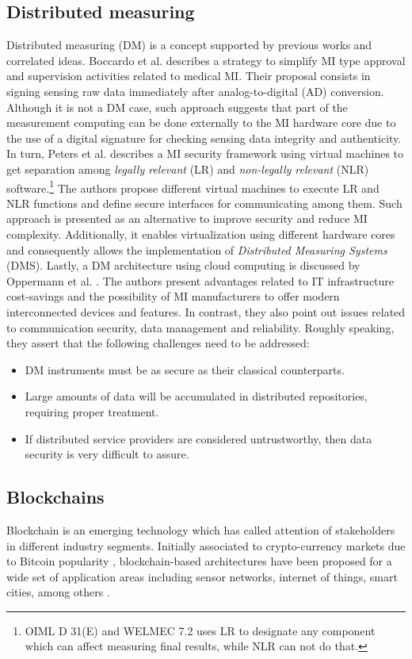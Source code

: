 \documentclass[journal]{IEEEtran}
\begin{document}
\subsection{Distributed measuring}
Distributed measuring (DM) is a concept supported by previous works and correlated ideas. 
Boccardo et al. \cite{Boccardo2014} describes a strategy to simplify MI type approval and supervision activities related to medical MI.
Their proposal consists in signing sensing raw data immediately after analog-to-digital (AD) conversion. 
Although it is not a DM case, such approach suggests that part of the measurement computing can be done externally to the MI hardware core due to the use of a digital signature for checking sensing data integrity and authenticity.
In turn, Peters et al. \cite{Peters2015} describes a MI security framework using virtual machines to get separation among \emph{legally relevant} (LR) and \emph{non-legally relevant} (NLR) software.\footnote{OIML D 31(E) and WELMEC 7.2 uses LR to designate any component which can affect measuring final results, while NLR can not do that.} The authors propose different virtual machines to execute LR and NLR functions and define secure interfaces for communicating among them. Such approach is presented as an alternative to improve security and reduce MI complexity. Additionally, it enables virtualization using different hardware cores and consequently allows the implementation of \emph{Distributed Measuring Systems} (DMS). Lastly, a DM architecture using cloud computing is discussed by Oppermann et al. \cite{Oppermann2016}. The authors present advantages related to IT infrastructure cost-savings and the possibility of MI manufacturers to offer modern interconnected devices and features. In contrast, they also point out issues related to communication security, data management and reliability. Roughly speaking, they assert that the following challenges need to be addressed:
\begin{itemize}
 \item DM instruments must be as secure as their classical counterparts.
 \item Large amounts of data will be accumulated in distributed repositories, requiring proper treatment.
 \item If distributed service providers are considered untrustworthy, then data security is very difficult to assure. 
\end{itemize}

\subsection{Blockchains}
Blockchain is an emerging technology which has called attention of stakeholders in different industry segments. 
Initially associated to crypto-currency markets due to Bitcoin popularity \cite{Nakamoto2008}, blockchain-based architectures have been proposed for a wide set of application areas including sensor networks, internet of things, smart cities, among others \cite{Christidis2016}. 
\end{document}
